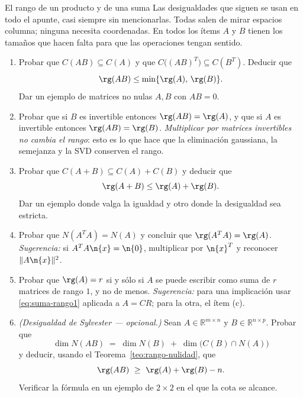 \begin{entrega}{El rango de un producto y de una suma}\label{ent:rango}
Las desigualdades que siguen se usan en todo el apunte, casi siempre sin
mencionarlas. Todas salen de mirar espacios columna; ninguna necesita
coordenadas. En todos los ítems $A$ y $B$ tienen los tamaños que hacen falta
para que las operaciones tengan sentido.

\begin{enumerate}[label=\textbf{(\alph*)},itemsep=3pt,topsep=4pt]
\item Probar que $C(AB) \subseteq C(A)$ y que $C\big((AB)^T\big) \subseteq C(B^T)$.
Deducir que
\[
\rg(AB) \le \min\{\rg(A),\, \rg(B)\}.
\]
Dar un ejemplo de matrices no nulas $A,B$ con $AB=0$.

\item Probar que si $B$ es invertible entonces $\rg(AB) = \rg(A)$, y que si $A$
es invertible entonces $\rg(AB)=\rg(B)$. \emph{Multiplicar por matrices
invertibles no cambia el rango}: esto es lo que hace que la eliminación
gaussiana, la semejanza y la SVD conserven el rango.

\item Probar que $C(A+B) \subseteq C(A) + C(B)$ y deducir que
\[
\rg(A+B) \le \rg(A) + \rg(B).
\]
Dar un ejemplo donde valga la igualdad y otro donde la desigualdad sea estricta.

\item Probar que $N(A^TA) = N(A)$ y concluir que $\rg(A^TA) = \rg(A)$.
\emph{Sugerencia:} si $A^TA\n{x} = \n{0}$, multiplicar por $\n{x}^T$ y reconocer
$\|A\n{x}\|^2$.

\item Probar que $\rg(A) = r$ si y sólo si $A$ se puede escribir como suma de
$r$ matrices de rango $1$, y no de menos. \emph{Sugerencia:} para una
implicación usar \eqref{eq:suma-rango1} aplicada a $A=CR$; para la otra, el
ítem (c).

\item \emph{(Desigualdad de Sylvester --- opcional.)} Sean
$A\in\mathbb{R}^{m\times n}$ y $B\in\mathbb{R}^{n\times p}$. Probar que
\[
\dim N(AB) \;=\; \dim N(B) \;+\; \dim\big(C(B)\cap N(A)\big)
\]
y deducir, usando el Teorema~\ref{teo:rango-nulidad}, que
\[
\rg(AB) \ \ge\ \rg(A) + \rg(B) - n .
\]
Verificar la fórmula en un ejemplo de $2\times2$ en el que la cota se alcance.
\end{enumerate}

\medskip
{}
\end{entrega}

